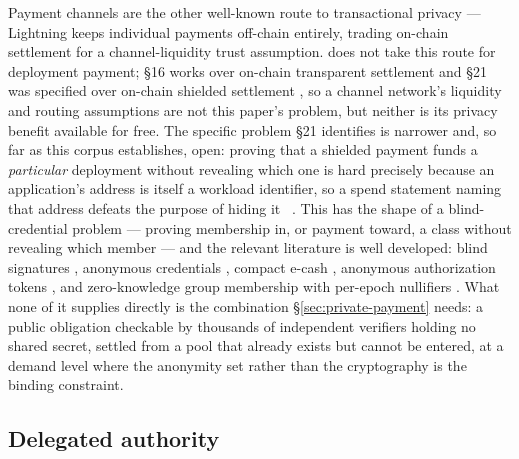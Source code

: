 Payment channels are the other well-known route to transactional privacy — Lightning
\citep{poon2016lightning} keeps individual payments off-chain entirely, trading on-chain settlement for
a channel-liquidity trust assumption. \Flux does not take this route for deployment payment; §16 works
over on-chain transparent settlement and §21 was specified over on-chain shielded settlement , so a channel network's
liquidity and routing assumptions are not this paper's problem, but neither is its privacy benefit
available for free. The specific problem §21 identifies is narrower and, so far as this corpus
establishes, open: proving that a shielded payment funds a \emph{particular} deployment without
revealing which one is hard precisely because an application's address is itself a workload identifier,
so a spend statement naming that address defeats the purpose of hiding it \vision\
. This has the shape of a blind-credential problem — proving membership
in, or payment toward, a class without revealing which member —
and the relevant literature is well developed: blind signatures \citep{chaum1982blind},
anonymous credentials \citep{camenisch2001credentials}, compact e-cash
\citep{camenisch2005ecash}, anonymous authorization tokens \citep{privacypass}, and
zero-knowledge group membership with per-epoch nullifiers \citep{semaphore}. What none of it
supplies directly is the combination \S\ref{sec:private-payment} needs: a public obligation
checkable by thousands of independent verifiers holding no shared secret, settled from a pool that
already exists but cannot be entered, at a demand level where the anonymity set rather than the
cryptography is the binding constraint.

\subsection{Delegated authority}\label{sec:rw-delegation}

